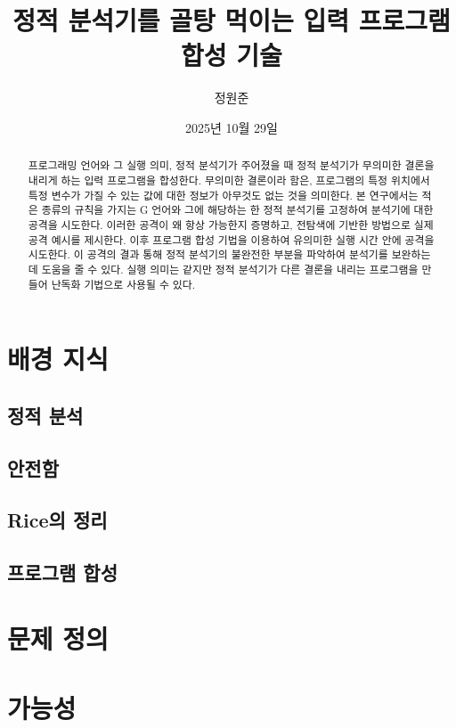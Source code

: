 \documentclass[ko]{snu-cse-bsc-thesis}
\title{정적 분석기를 골탕 먹이는 입력 프로그램 합성 기술}
\author{정원준}
\date{2025년 10월 29일}
\begin{document}
\maketitle

\begin{abstract}
프로그래밍 언어와 그 실행 의미, 정적 분석기가 주어졌을 때 정적 분석기가 무의미한 결론을 내리게 하는 입력 프로그램을 합성한다.
무의미한 결론이라 함은, 프로그램의 특정 위치에서 특정 변수가 가질 수 있는 값에 대한 정보가 아무것도 없는 것을 의미한다.
본 연구에서는 적은 종류의 규칙을 가지는 G 언어와 그에 해당하는 한 정적 분석기를 고정하여 분석기에 대한 공격을 시도한다.
이러한 공격이 왜 항상 가능한지 증명하고, 전탐색에 기반한 방법으로 실제 공격 예시를 제시한다.
이후 프로그램 합성 기법을 이용하여 유의미한 실행 시간 안에 공격을 시도한다. 
이 공격의 결과 통해 정적 분석기의 불완전한 부분을 파악하여 분석기를 보완하는데 도움을 줄 수 있다.
실행 의미는 같지만 정적 분석기가 다른 결론을 내리는 프로그램을 만들어 난독화 기법으로 사용될 수 있다.
\end{abstract}

\tableofcontents

\chapter{배경 지식}\label{chap:background}
\section{정적 분석}\label{sec:static_analysis}
\section{안전함}\label{sec:soundness}
\section{Rice의 정리}\label{sec:rices_theorem}
\section{프로그램 합성}\label{sec:program_synthesis}

\chapter{문제 정의}\label{chap:problem_definition}

\chapter{가능성}\label{chap:possibility}
\end{document}
